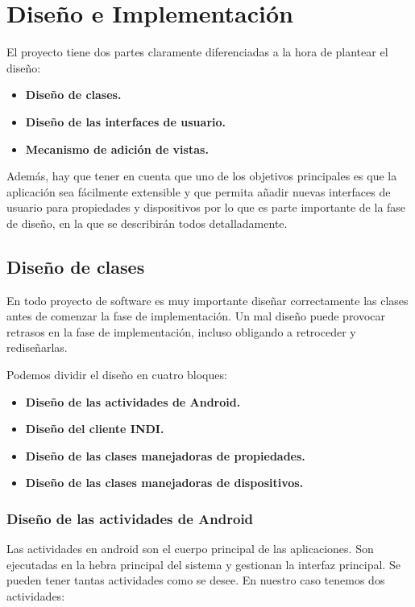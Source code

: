 \chapter{Diseño e Implementación}

El proyecto tiene dos partes claramente diferenciadas a la hora de plantear el diseño:

\begin{itemize}
  \item \textbf{Diseño de clases.}
  \item \textbf{Diseño de las interfaces de usuario.}
  \item \textbf{Mecanismo de adición de vistas.}
\end{itemize}

Además, hay que tener en cuenta que uno de los objetivos principales es que la aplicación sea fácilmente extensible y que permita añadir nuevas interfaces de usuario para propiedades y dispositivos por lo que es parte importante de la fase de diseño, en la que se describirán todos detalladamente.

\bigskip
\section{Diseño de clases}

En todo proyecto de software es muy importante diseñar correctamente las clases antes de comenzar la fase de implementación. Un mal diseño puede provocar retrasos en la fase de implementación, incluso obligando a retroceder y rediseñarlas.

\bigskip
Podemos dividir el diseño en cuatro bloques:

\begin{itemize}
  \item \textbf{Diseño de las actividades de Android.}
  \item \textbf{Diseño del cliente INDI.}
  \item \textbf{Diseño de las clases manejadoras de propiedades.}
  \item \textbf{Diseño de las clases manejadoras de dispositivos.}
\end{itemize}

\newpage
\subsection{Diseño de las actividades de Android}

Las actividades en android son el cuerpo principal de las aplicaciones. Son ejecutadas en la hebra principal del sistema y gestionan la interfaz principal. Se pueden tener tantas actividades como se desee. En nuestro caso tenemos dos actividades:


